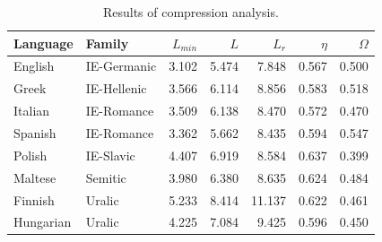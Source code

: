 \begin{table}[!h]
\centering
\caption{Results of compression analysis.}
\centering
\begin{tabular}[t]{llrrrrr}
\toprule
Language & Family & $L_{min}$ & $L$ & $L_r$ & $\eta$ & $\Omega$\\
\midrule
English & IE-Germanic & 3.102 & 5.474 & 7.848 & 0.567 & 0.500\\
Greek & IE-Hellenic & 3.566 & 6.114 & 8.856 & 0.583 & 0.518\\
Italian & IE-Romance & 3.509 & 6.138 & 8.470 & 0.572 & 0.470\\
Spanish & IE-Romance & 3.362 & 5.662 & 8.435 & 0.594 & 0.547\\
Polish & IE-Slavic & 4.407 & 6.919 & 8.584 & 0.637 & 0.399\\
\addlinespace
Maltese & Semitic & 3.980 & 6.380 & 8.635 & 0.624 & 0.484\\
Finnish & Uralic & 5.233 & 8.414 & 11.137 & 0.622 & 0.461\\
Hungarian & Uralic & 4.225 & 7.084 & 9.425 & 0.596 & 0.450\\
\bottomrule
\end{tabular}
\end{table}
